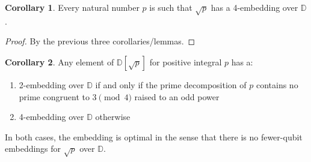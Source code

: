 \documentclass{article}
\theoremstyle{definition}
\theoremstyle{theorem}
\newtheorem{corollary}{Corollary}
\theoremstyle{remark}
\begin{document}
    \begin{corollary}
        Every natural number $p$ is such that $\sqrt{p}$ has a 4-embedding over $\mathbb{D}$.
    \end{corollary}
    \begin{proof}
        By the previous three corollaries/lemmas.
    \end{proof}

	\begin{corollary}
		Any element of $\mathbb{D}[\sqrt{p}]$ for positive integral $p$ has a:
		\begin{enumerate}
			\item 2-embedding over $\mathbb{D}$ if and only if the prime decomposition of $p$ contains no prime congruent to $3\pmod 4$ raised to an odd power
			\item 4-embedding over $\mathbb{D}$ otherwise
		\end{enumerate}	
	    In both cases, the embedding is optimal in the sense that there is no fewer-qubit embeddings for $\sqrt{p}$ over $\mathbb{D}$.
	\end{corollary}
	
\end{document}
